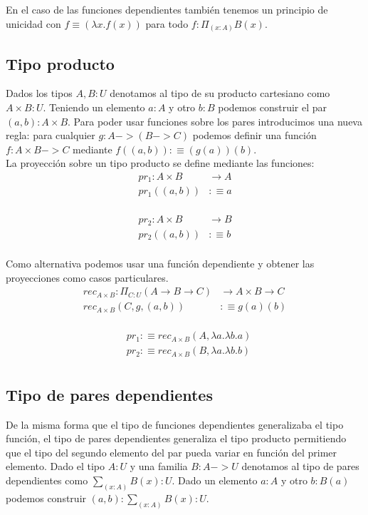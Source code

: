 En el caso de las funciones dependientes también tenemos un principio de unicidad con $f \equiv (\lambda x.f(x))$ para todo $f:\Pi_{(x:A)} B(x)$.\\


\subsection{Tipo producto}

Dados los tipos $A,B:U$ denotamos al tipo de su producto cartesiano como $A \times B : U$. Teniendo un elemento $a:A$ y otro $b:B$ podemos construir el par $(a, b) : A \times B$. Para poder usar funciones sobre los pares introducimos una nueva regla: para cualquier $g : A -> (B -> C)$ podemos definir una función $f : A \times B -> C$ mediante $f((a, b)) :\equiv (g(a))(b)$.\\

La proyección sobre un tipo producto se define mediante las funciones:\\

\begin{align*}
  pr_1 \colon A \times B &\to A\\
  pr_1((a, b)) &:\equiv a\\
\end{align*}

\begin{align*}
  pr_2 \colon A \times B &\to B\\
  pr_2((a, b)) &:\equiv b\\
\end{align*}

Como alternativa podemos usar una función dependiente y obtener las proyecciones como casos particulares.\\

\begin{align*}
  rec_{A\times B} \colon \Pi_{C:U} (A \to B \to C) &\to A \times B \to C\\
  rec_{A\times B}(C, g, (a, b)) &:\equiv g(a)(b)\\
\end{align*}

\begin{align*}
  &pr_1 :\equiv rec_{A\times B}(A, \lambda a.\lambda b.a)\\
  &pr_2 :\equiv rec_{A\times B}(B, \lambda a.\lambda b.b)\\
\end{align*}


\subsection{Tipo de pares dependientes}
De la misma forma que el tipo de funciones dependientes generalizaba el tipo función, el tipo de pares dependientes generaliza el tipo producto permitiendo que el tipo del segundo elemento del par pueda variar en función del primer elemento. Dado el tipo $A:U$ y una familia $B : A->U$ denotamos al tipo de pares dependientes como $\sum_{(x:A)} B(x):U$. Dado un elemento $a:A$ y otro $b:B(a)$ podemos construir $(a, b) : \sum_{(x:A)} B(x):U$.\\

